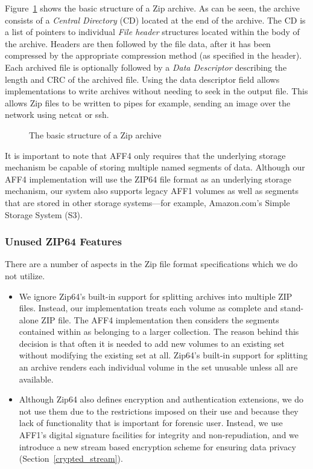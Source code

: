 \documentclass[10pt, conference]{IEEEtran}
\begin{document}
Figure~\ref{zip_structure} shows the basic structure of a Zip
archive. As can be seen, the archive consists of a {\em Central Directory} (CD)
located at the end of the archive. The CD is a list of pointers to
individual {\em File header} structures located within the body of the
archive. Headers are then followed by the file data, after it has been
compressed by the appropriate compression method (as specified in the
header). Each archived file is optionally followed by a {\em Data
Descriptor} describing the length and CRC of the archived file. Using
the data descriptor field allows implementations to write archives
without needing to seek in the output file. This allows Zip files to
be written to pipes for example, sending an image over the network
using netcat or ssh.

\begin{figure}[tb]
  \begin{center}
  \mbox{\columnwidth {}}
  \caption{The basic structure of a Zip archive}
  \label{zip_structure}
  \end{center}
\end{figure}

It is important to note that AFF4 only requires that the underlying storage mechanism
be capable of storing multiple named segments of data. Although our
AFF4 implementation will use the ZIP64 file format as an underlying storage
mechanism, our system also supports legacy AFF1 volumes as well as
segments that are stored in other storage systems---for example,
Amazon.com's Simple Storage System (S3)\cite{s2-aws-home-page-money}.

\subsubsection{Unused ZIP64 Features}

There are a number of aspects in the Zip file format specifications
which we do not utilize. 
\begin{itemize}
\item We ignore Zip64's built-in support for splitting
archives into multiple ZIP files. Instead, our implementation treats
each volume as complete and stand-alone ZIP file. The AFF4
implementation then considers the segments contained within as 
belonging to a larger collection. The reason behind this decision is that
often it is needed to add new volumes to an existing set without
modifying the existing set at all. Zip64's built-in support for
splitting an archive renders each individual volume in the set
unusable unless all are available. 

\item Although Zip64 also defines encryption and authentication
extensions, we do not use them due to the
restrictions imposed on their use and because they lack of functionality that is
important for forensic user. Instead, we use AFF1's digital signature
facilities for integrity and non-repudiation, and we introduce a new  stream based
encryption scheme for ensuring data privacy (Section~\ref{crypted_stream}).

\end{itemize}
\end{document}
